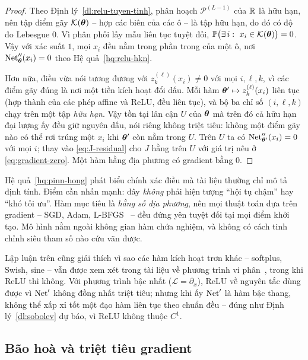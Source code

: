 \begin{proof}
Theo Định lý~\ref{dl:relu-tuyen-tinh}, phân hoạch $\mathcal{P}^{(L-1)}$ của
$\mathbb{R}$ là hữu hạn, nên tập điểm gãy $\mathcal{K}(\bm{\theta})$ -- hợp các biên của các
ô -- là tập hữu hạn, do đó có độ đo Lebesgue $0$. Vì phân phối lấy mẫu liên tục
tuyệt đối, $\mathbb{P}\big(\exists\, i:\ x_i \in \mathcal{K}(\bm{\theta})\big) = 0$.
Vậy với xác suất $1$, mọi $x_i$ đều nằm trong phần trong của một ô, nơi
$\operatorname{Net}''_{\bm{\theta}}(x_i) = 0$ theo Hệ quả~\ref{hq:relu-hkn}.
 
Hơn nữa, điều vừa nói tương đương với $z^{(\ell)}_k(x_i) \ne 0$ với mọi
$i,\ell,k$, vì các điểm gãy đúng là nơi một tiền kích hoạt đổi dấu. Mỗi hàm
$\bm{\theta}' \mapsto z^{(\ell)}_k(x_i)$ liên tục (hợp thành của các phép affine và
ReLU, đều liên tục), và bộ ba chỉ số $(i,\ell,k)$ chạy trên một tập
\emph{hữu hạn}. Vậy tồn tại lân cận $U$ của $\bm{\theta}$ mà trên đó cả hữu hạn
đại lượng ấy đều giữ nguyên dấu, nói riêng không triệt tiêu: không một điểm gãy
nào có thể rơi trúng một $x_i$ khi $\bm{\theta}'$ còn nằm trong $U$. Trên $U$ ta có
$\operatorname{Net}''_{\bm{\theta}'}(x_i) = 0$ với mọi $i$; thay vào \eqref{eq:J-residual} cho
$J$ hằng trên $U$ với giá trị nêu ở \eqref{eq:gradient-zero}. Một hàm hằng địa
phương có gradient bằng $0$.
\end{proof}
 
Hệ quả~\ref{hq:pinn-hong} phát biểu chính xác điều mà tài liệu thường chỉ mô tả
định tính. Điểm cần nhấn mạnh: đây \emph{không} phải hiện tượng ``hội tụ chậm''
hay ``khó tối ưu''. Hàm mục tiêu là \emph{hằng số địa phương}, nên mọi thuật
toán dựa trên gradient -- SGD, Adam, L-BFGS~\cite{nocedal2006} -- đều đứng yên
tuyệt đối tại mọi điểm khởi tạo. Mô hình nằm ngoài không gian hàm chứa nghiệm,
và không có cách tinh chỉnh siêu tham số nào cứu vãn được.
 
\begin{nhanxet}
Lập luận trên cũng giải thích vì sao các hàm kích hoạt trơn khác -- softplus,
Swish, sine -- vẫn được xem xét trong tài liệu về phương trình vi
phân~\cite{karniadakis2021}, trong khi ReLU thì không. Với phương trình bậc nhất
($\mathcal{L} = \partial_x$), ReLU về nguyên tắc dùng được vì $\operatorname{Net}'$ không đồng
nhất triệt tiêu; nhưng khi ấy $\operatorname{Net}'$ là hàm bậc thang, không thể xấp xỉ tốt một
đạo hàm liên tục theo chuẩn đều -- đúng như Định lý~\ref{dl:sobolev} dự báo, vì
ReLU không thuộc $C^1$.
\end{nhanxet}
 
\subsection{Bão hoà và triệt tiêu gradient}
\label{subsec:bao-hoa}
 
